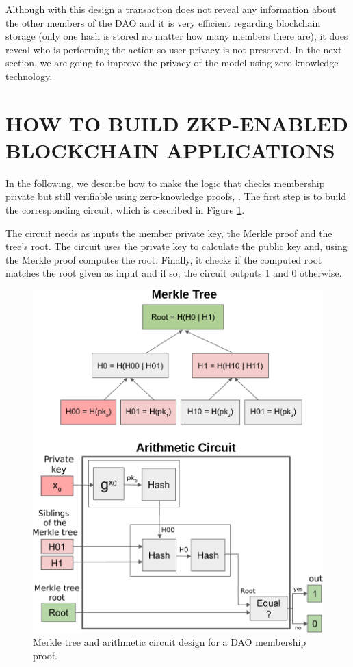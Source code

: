 \documentclass{IEEEcsmag}
\begin{document}
Although with this design a transaction does not reveal any 
information about the other members of the DAO
and it is very efficient regarding blockchain storage (only one 
hash is stored no matter how many members there are), 
it does reveal who is performing the action so user-privacy is not preserved.
In the next section, we are going to improve the privacy of the 
model using zero-knowledge technology.

\section{HOW TO BUILD ZKP-ENABLED BLOCKCHAIN APPLICATIONS}

In the following, we describe how to make 
the logic that checks membership private but still verifiable 
using zero-knowledge proofs, . 
The first step is to build the corresponding circuit, 
which is described in Figure \ref{fig:tree_and_circuit}.

The circuit needs as inputs the member private key, the Merkle proof 
and the tree's root. 
The circuit uses the private key to calculate the public key
and, using the Merkle proof computes the root.
Finally, it checks if the computed root matches the root given as input and
if so, the circuit outputs 1 and 0 otherwise. 


\begin{figure}[h!]
	\centering
	\includegraphics[width=1\columnwidth]{figures/tree_and_circuit}
	\caption{Merkle tree and arithmetic circuit design for a DAO membership proof. \label{fig:tree_and_circuit}}
\end{figure}
\end{document}
